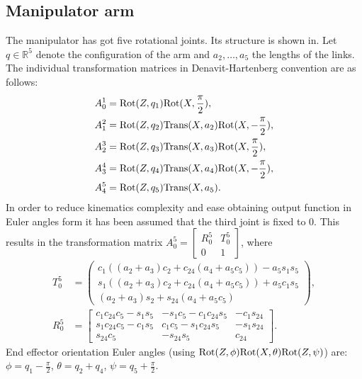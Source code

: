 \subsection{Manipulator arm}
The manipulator has got five rotational joints. Its structure is shown in. %
Let $q\in \mathbb{R}^5$ denote the configuration of the arm and $a_2, \dots, a_5$ the lengths of the links. The individual transformation matrices in Denavit-Hartenberg convention are as follows:
\begin{equation}
\begin{aligned}
A_0^1 &= \mathrm{Rot}(Z, q_1)\mathrm{Rot}(X, \frac{\pi}{2}),\\
A_1^2 &= \mathrm{Rot}(Z, q_2)\mathrm{Trans} (X, a_2)\mathrm{Rot}(X, -\frac{\pi}{2}),\\
A_2^3 &= \mathrm{Rot}(Z, q_3)\mathrm{Trans} (X, a_3)\mathrm{Rot}(X, \frac{\pi}{2}),\\
A_3^4 &= \mathrm{Rot}(Z, q_4)\mathrm{Trans} (X, a_4)\mathrm{Rot}(X, -\frac{\pi}{2}),\\
A_4^5 &= \mathrm{Rot}(Z, q_5)\mathrm{Trans} (X, a_5).
\end{aligned}
\end{equation}
In order to reduce kinematics complexity and ease obtaining output function in Euler angles form it has been assumed that the third joint is fixed to $0$. This results in the transformation matrix $
A_0^5=\begin{bmatrix}
R_0^5 & T_0^5\\
0 & 1
\end{bmatrix}$, 
where
\begin{align}
T_0^5 &= \begin{pmatrix}
c_1\left((a_2+a_3)c_2 + c_{24}(a_4+a_5c_5)\right) - a_5s_1s_5\\
s_1\left((a_2+a_3)c_2 + c_{24}(a_4+a_5c_5)\right) + a_5c_1s_5\\
    (a_2+a_3)s_2 + s_{24}(a_4+a_5c_5)
\end{pmatrix},\\
R_0^5 &= \begin{bmatrix}
c_1c_{24}c_5-s_1s_5 & -s_1c_5-c_1c_{24}s_5 & -c_1s_{24}\\
s_1c_{24}c_5-c_1s_5 &  c_1c_5-s_1c_{24}s_5 & -s_1s_{24}\\
s_{24}c_5           & -s_{24}s_5           &  c_{24}
\end{bmatrix}.
\end{align}
End effector orientation Euler angles (using $\mathrm{Rot}(Z,\phi)\mathrm{Rot}(X, \theta)\mathrm{Rot}(Z, \psi)$) are: $\phi=q_1-\frac{\pi}{2}$, $\theta=q_2+q_4$, $\psi=q_5+\frac{\pi}{2}$.

